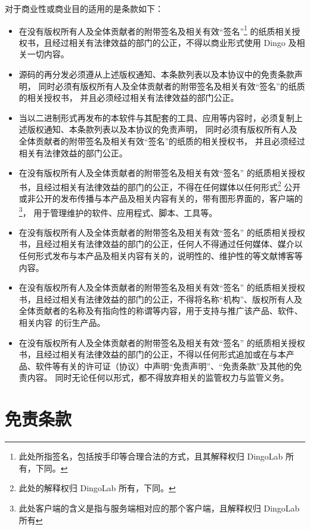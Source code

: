   对于商业性或商业目的适用的是条款如下：
  \begin{itemize}
    \item 在没有版权所有人及全体贡献者的附带签名及相关有效“签名”\footnote{此处所指签名，包括按手印等合理合法的方式，且其解释权归 DingoLab 所有，下同。}
      的纸质相关授权书，且经过相关有法律效益的部门的公正，不得以商业形式使用 Dingo 及相关一切内容。
    \item 源码的再分发必须遵从上述版权通知、本条款列表以及本协议中的免责条款声明，
      同时必须有版权所有人及全体贡献者的附带签名及相关有效“签名”的纸质的相关授权书，
      并且必须经过相关有法律效益的部门公正。
    \item 当以二进制形式再发布的本软件与其配套的工具、应用等内容时，必须复制上述版权通知、本条款列表以及本协议的免责声明，
      同时必须有版权所有人及全体贡献者的附带签名及相关有效“签名”的纸质的相关授权书，
      并且必须经过相关有法律效益的部门公正。
    \item 在没有版权所有人及全体贡献者的附带签名及相关有效“签名”
      的纸质相关授权书，且经过相关有法律效益的部门的公正，不得在任何媒体以任何形式\footnote{此处的解释权归 DingoLab 所有，下同。}
      公开或非公开的发布传播与本产品及相关内容有关的，带有图形界面的，客户端的\footnote{此处客户端的含义是指与服务端相对应的那个客户端，且解释权归 DingoLab 所有}，
      用于管理维护的软件、应用程式、脚本、工具等。
    \item 在没有版权所有人及全体贡献者的附带签名及相关有效“签名”
      的纸质相关授权书，且经过相关有法律效益的部门的公正，任何人不得通过任何媒体、媒介以任何形式发布与本产品及相关内容有关的，说明性的、维护性的等文献博客等内容。
    \item 在没有版权所有人及全体贡献者的附带签名及相关有效“签名”
      的纸质相关授权书，且经过相关有法律效益的部门的公正，不得将名称“机构”、版权所有人及全体贡献者的名称及有指向性的称谓等内容，用于支持与推广该产品、软件、相关内容
      的衍生产品。
    \item 在没有版权所有人及全体贡献者的附带签名及相关有效“签名”
      的纸质相关授权书，且经过相关有法律效益的部门的公正，不得以任何形式追加或在与本产品、软件等有关的许可证（协议）中声明“免责声明”、“免责条款”及其他的免责内容。
      同时无论任何以形式，都不得放弃相关的监管权力与监管义务。
  \end{itemize}

  \section{免责条款}
